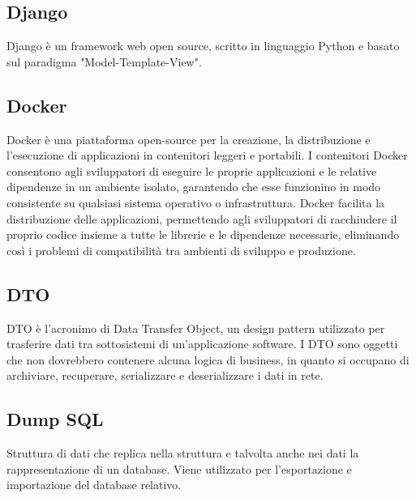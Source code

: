 \vspace{2em}
\subsection*{Django}
\par Django è un framework web open source, scritto in linguaggio Python e basato sul paradigma "Model-Template-View".

\vspace{2em}
\subsection*{Docker}
\par Docker è una piattaforma open-source per la creazione, la distribuzione e l'esecuzione di applicazioni in contenitori leggeri e portabili. I contenitori Docker consentono agli sviluppatori di eseguire le proprie applicazioni e le relative dipendenze in un ambiente isolato, garantendo che esse funzionino in modo consistente su qualsiasi sistema operativo o infrastruttura. Docker facilita la distribuzione delle applicazioni, permettendo agli sviluppatori di racchiudere il proprio codice insieme a tutte le librerie e le dipendenze necessarie, eliminando così i problemi di compatibilità tra ambienti di sviluppo e produzione.

\vspace{2em}
\subsection*{DTO}
\par DTO è l'acronimo di Data Transfer Object, un design pattern utilizzato per trasferire dati tra sottosistemi di un'applicazione software. I DTO sono oggetti che non dovrebbero contenere alcuna logica di business, in quanto si occupano di archiviare, recuperare, serializzare e deserializzare i dati in rete.

\vspace{2em}
\subsection*{Dump SQL}
\par Struttura di dati che replica nella struttura e talvolta anche nei dati la rappresentazione di un database. Viene utilizzato per l'esportazione e importazione del database relativo.
